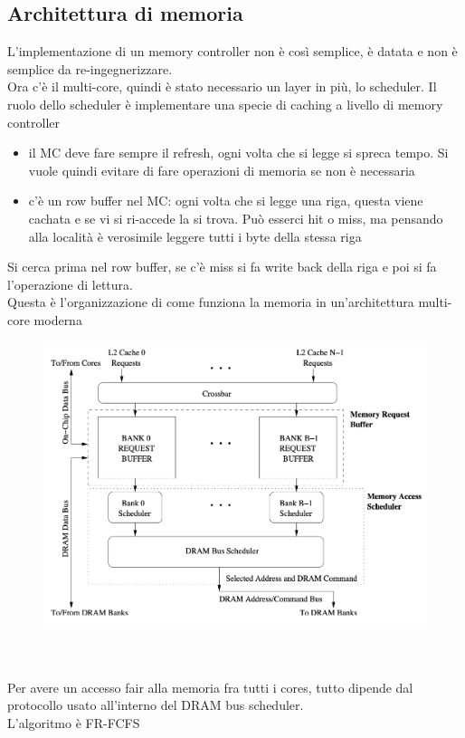 \documentclass[12pt, oneside]{extbook} %
\begin{document}
\subsection{Architettura di memoria}
L'implementazione di un memory controller non è così semplice, è datata e non è semplice da re-ingegnerizzare.\\ Ora c'è il multi-core, quindi è stato necessario un layer in più, lo scheduler. Il ruolo dello scheduler è implementare una specie di caching a livello di memory controller
\begin{itemize}
\item il MC deve fare sempre il refresh, ogni volta che si legge si spreca tempo. Si vuole quindi evitare di fare operazioni di memoria se non è necessaria
\item c'è un row buffer nel MC: ogni volta che si legge una riga, questa viene cachata e se vi si ri-accede la si trova. Può esserci hit o miss, ma pensando alla località è verosimile leggere tutti i byte della stessa riga
\end{itemize}
Si cerca prima nel row buffer, se c'è miss si fa write back della riga e poi si fa l'operazione di lettura.\\ Questa è l'organizzazione di come funziona la memoria in un'architettura multi-core moderna\\
\begin{figure}
	\includegraphics[scale=0.3]{immagini/dram_mc.png}
\end{figure}\\\\
Per avere un accesso fair alla memoria fra tutti i cores, tutto dipende dal protocollo usato all'interno del DRAM bus scheduler.\\L'algoritmo è FR-FCFS
\end{document}
